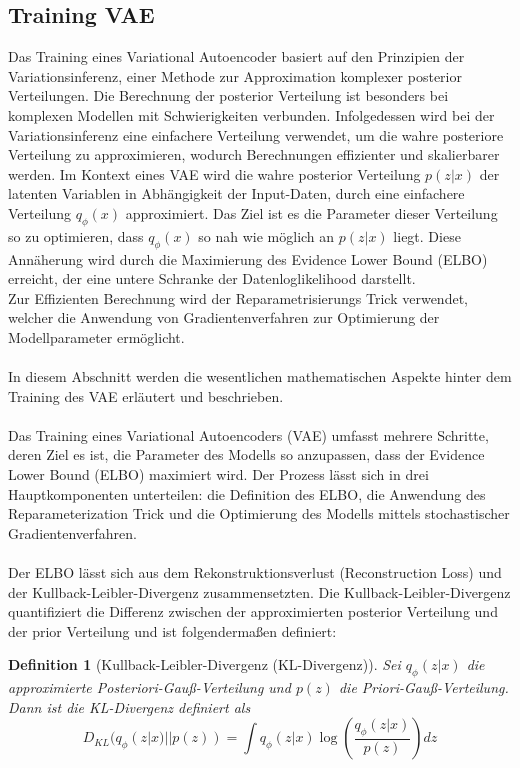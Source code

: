 \documentclass[%
thesis=student,%
coverpage=false,%
titlepage=false,%
headmarks=true, %
german,%
font=libertine, %
math=newpxtx, %
BCOR=5mm,%
coverBCOR=11mm%
]{tumbook}
\theoremstyle{break}
\newtheorem{definition}{Definition}[section]
\begin{document}
\subsection{Training VAE}
Das Training eines Variational Autoencoder basiert auf den Prinzipien der Variationsinferenz, einer Methode zur Approximation komplexer posterior Verteilungen. Die Berechnung der posterior Verteilung ist besonders bei komplexen Modellen mit Schwierigkeiten verbunden. Infolgedessen wird bei der Variationsinferenz eine einfachere Verteilung verwendet, um die wahre posteriore Verteilung zu approximieren, wodurch Berechnungen effizienter und skalierbarer werden.
Im Kontext eines VAE wird die wahre posterior Verteilung $p(z|x)$ der latenten Variablen in Abhängigkeit der Input-Daten, durch eine einfachere Verteilung $q_\phi(x)$ approximiert. Das Ziel ist es die Parameter dieser Verteilung so zu optimieren, dass $q_\phi(x)$ so nah wie möglich an $p(z|x)$ liegt. Diese Annäherung wird durch die Maximierung des Evidence Lower Bound (ELBO) erreicht, der eine untere Schranke der Datenloglikelihood darstellt. \\
Zur Effizienten Berechnung wird der Reparametrisierungs Trick verwendet, welcher die Anwendung von Gradientenverfahren zur Optimierung der Modellparameter ermöglicht.\\
\\
In diesem Abschnitt werden die wesentlichen mathematischen Aspekte hinter dem Training des VAE erläutert und beschrieben.\\
\\
Das Training eines Variational Autoencoders (VAE) umfasst mehrere Schritte, deren Ziel es ist, die Parameter des Modells so anzupassen, dass der Evidence Lower Bound (ELBO) maximiert wird. Der Prozess lässt sich in drei Hauptkomponenten unterteilen: die Definition des ELBO, die Anwendung des Reparameterization Trick und die Optimierung des Modells mittels stochastischer Gradientenverfahren.\\
\\
Der ELBO lässt sich aus dem Rekonstruktionsverlust (Reconstruction Loss) und der Kullback-Leibler-Divergenz zusammensetzten. Die Kullback-Leibler-Divergenz quantifiziert die Differenz zwischen der approximierten posterior Verteilung und der prior Verteilung und ist folgendermaßen definiert:\\
\begin{definition}[Kullback-Leibler-Divergenz (KL-Divergenz)]
Sei $q_\phi(z|x)$ die approximierte Posteriori-Gauß-Verteilung und $p(z)$ die Priori-Gauß-Verteilung. Dann ist die KL-Divergenz definiert als
$$D_{KL}(q_\phi(z|x)||p(z))= \int q_\phi(z|x) \log \left(\frac{q_\phi(z|x)}{p(z)} \right)dz$$
\end{definition}\noindent
\end{document}
